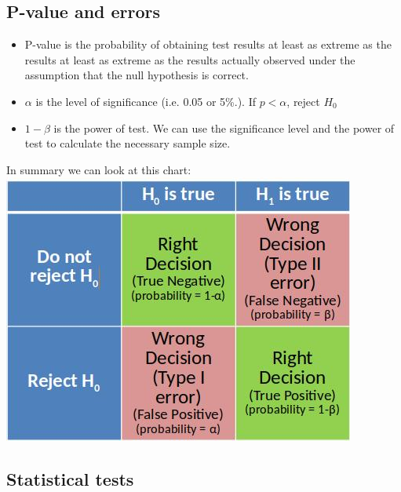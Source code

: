 \documentclass[12pt]{book}
\begin{document}
\subsection*{P-value and errors}

\begin{itemize}
  \item P-value is the probability of obtaining test results at least as extreme as the results at least as extreme as the results actually observed under the assumption that the null hypothesis is correct.
  \item $\alpha$ is the level of significance (i.e. 0.05 or 5\%.). If $p<\alpha$, reject $H_0$
  \item $1-\beta$ is the power of test. We can use the significance level and the power of test to calculate the necessary sample size.\\
  
\end{itemize}
In summary we can look at this chart:\\
\includegraphics*[width=\textwidth]{chart}

\subsection*{Statistical tests}
\end{document}
